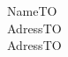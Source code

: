 \documentclass[hardturmstr,paper=a4,version=last,fontsize=11pt,DIV=13,BCOR=0mm]{scrlttr2}
\begin{document}
\begin{letter}{NameTO\\AdressTO\\AdressTO}

  \subject{}

  \opening{}

  \closing{}

\end{letter}
\end{document}
